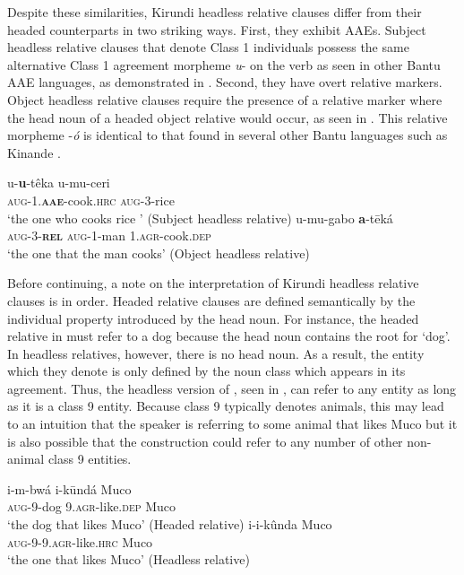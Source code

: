 \documentclass[output=paper,colorlinks,citecolor=brown
]{langscibook}
\begin{document}
Despite these similarities, Kirundi headless relative clauses differ from their headed counterparts in two striking ways. First, they exhibit AAEs. Subject headless relative clauses that denote Class 1 individuals possess the same alternative Class 1 agreement morpheme \emph{u}- on the verb as seen in other Bantu AAE languages, as demonstrated in . Second, they have overt relative markers. Object headless relative clauses require the presence of a relative marker where the head noun of a headed object relative would occur, as seen in . This relative morpheme -\emph{ó} is identical to that found in several other Bantu languages such as Kinande \citep{SchneiderZioga:2007}.

\ea \label{ex:myers:HRC}
\begin{xlist}
 \ex	\label{ex:myers:HRCa}\gll	u-{\bfseries  u}-têka u-mu-ceri \\ 
		\textsc{aug}-1.{\bfseries  \textsc{aae}}-cook.\textsc{hrc} \textsc{aug}-3-rice\\
		\glt `the one who cooks rice '  \hfill{(Subject headless relative)}
\ex \label{ex:myers:HRCb} u-mu-gabo {\bfseries  a}-tēká\\
\textsc{aug-3}-{\bfseries  \textsc{rel}} \textsc{aug}-1-man \textsc{1.agr}-cook.\textsc{dep} \\
\glt `the one that the man cooks'  \hfill{(Object headless relative)}
\end{xlist}
\z


Before continuing, a note on the interpretation of Kirundi headless relative clauses is in order. Headed relative clauses are defined semantically by the individual property introduced by the head noun. For instance, the headed relative in  must refer to a dog because the head noun contains the root for `dog'. In headless relatives, however, there is no head noun. As a result, the entity which they denote is only defined by the noun class which appears in its agreement. Thus, the headless version of , seen in , can refer to any entity as long as it is a class 9 entity. Because class 9 typically denotes animals, this may lead to an intuition that the speaker is referring to some animal that likes Muco but it is also possible that the construction could refer to any number of other non-animal class 9 entities.


\ea \label{ex:myers:hungry}
\begin{xlist}
 \ex	\label{ex:myers:hungrya}\gll	i-m-bwá i-kūndá Muco \\ 
		\textsc{aug}-9-dog 9.\textsc{agr}-like.\textsc{dep} Muco\\
		\glt `the dog that likes Muco'  \hfill{(Headed relative)}
\ex \label{ex:myers:hungryb}\gll i-i-kûnda Muco \\ 
		\textsc{aug}-9-9.\textsc{agr}-like.\textsc{hrc} Muco\\
		\glt `the one that likes Muco'  \hfill{(Headless relative)}
\end{xlist}
\z
\end{document}
